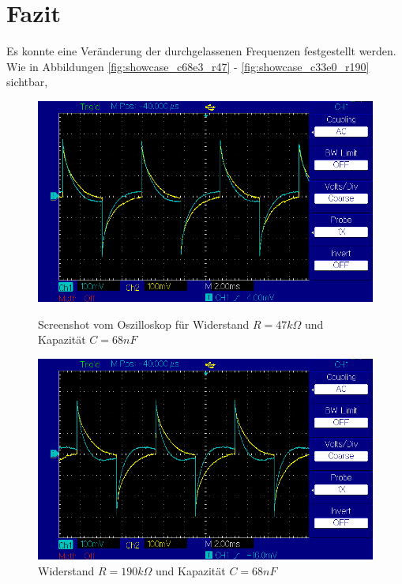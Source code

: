 \documentclass{article}
\begin{document}
\section{Fazit}

Es konnte eine Veränderung der durchgelassenen Frequenzen festgestellt werden. Wie in Abbildungen \ref{fig:showcase_c68e3_r47} - \ref{fig:showcase_c33e0_r190} sichtbar, 

\begin{figure}[ht]
        \centering
        \includegraphics[width=\linewidth]{figures/results/resistor_47_Ohm/c68000pF.png}
        \caption{Screenshot vom Oszilloskop für Widerstand $R = 47k\Omega$ und Kapazität $C = 68nF$}
        \label{fig:showcase_c68e3_r47}
    \endminipage\hfill
        \centering
        \includegraphics[width=\linewidth]{figures/results/resistor_190_Ohm/c68000pF.png}
        \caption{Widerstand $R = 190k\Omega$ und Kapazität $C = 68nF$}
        \label{fig:showcase_c68e3_r190}

\end{figure}
\end{document}
